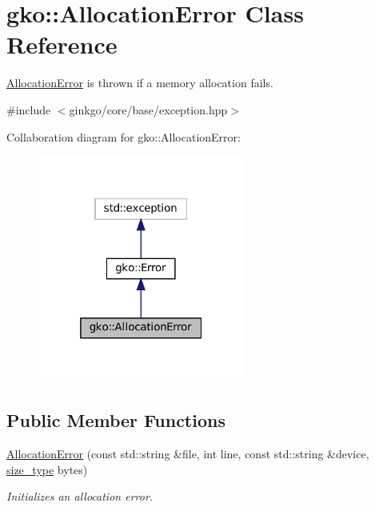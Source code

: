\hypertarget{classgko_1_1AllocationError}{}\section{gko\+:\+:Allocation\+Error Class Reference}
\label{classgko_1_1AllocationError}


\hyperlink{classgko_1_1AllocationError}{Allocation\+Error} is thrown if a memory allocation fails.  




{\ttfamily \#include $<$ginkgo/core/base/exception.\+hpp$>$}



Collaboration diagram for gko\+:\+:Allocation\+Error\+:
\nopagebreak
\begin{figure}[H]
\begin{center}
\leavevmode
\includegraphics[width=193pt]{classgko_1_1AllocationError__coll__graph}
\end{center}
\end{figure}
\subsection*{Public Member Functions}
\begin{DoxyCompactItemize}
\item 
\hyperlink{classgko_1_1AllocationError_ab06f1e22cd0cd39acab7cd5e96f2f9ca}{Allocation\+Error} (const std\+::string \&file, int line, const std\+::string \&device, \hyperlink{namespacegko_a6e5c95df0ae4e47aab2f604a22d98ee7}{size\+\_\+type} bytes)
\begin{DoxyCompactList}\small\item\em Initializes an allocation error. \end{DoxyCompactList}\end{DoxyCompactItemize}


